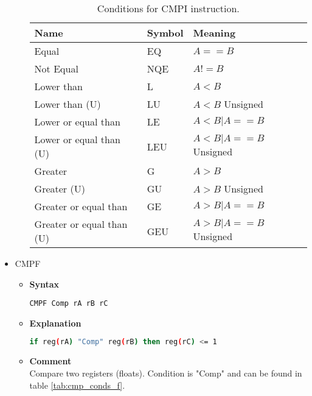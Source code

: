 \begin{itemize}
\begin{itemize}
    \begin{table}[h]
        \centering
        \begin{tabular}{|l|l|l|}
            \hline
            \textbf{Name}             & \textbf{Symbol} & \textbf{Meaning}      \\ \hline
            Equal                     & EQ              & $A==B$                \\ \hline
            Not Equal                 & NQE             & $A!=B$                \\ \hline
            Lower than                & L               & $A<B$                 \\ \hline
            Lower than (U)            & LU              & $A<B$ Unsigned        \\ \hline
            Lower or equal than       & LE              & $A<B | A==B$          \\ \hline
            Lower or equal than (U)   & LEU             & $A<B | A==B$ Unsigned \\ \hline
            Greater                   & G               & $A>B$                 \\ \hline
            Greater (U)               & GU              & $A>B$ Unsigned        \\ \hline
            Greater or equal than     & GE              & $A>B | A==B$          \\ \hline
            Greater or equal than (U) & GEU             & $A>B | A==B$ Unsigned \\ \hline
        \end{tabular}
        \caption{Conditions for CMPI instruction.}
        \label{tab:cmp_conds_i}
    \end{table}

    \end{itemize}

    \item CMPF
    \begin{itemize}
        \item \textbf{Syntax}
        \begin{lstlisting}[language={[markII]Assembler}, frame=single]
    CMPF Comp rA rB rC
        \end{lstlisting}
        \item \textbf{Explanation}
        \begin{lstlisting}[language=bash, frame=single]
    if reg(rA) "Comp" reg(rB) then reg(rC) <= 1
        \end{lstlisting}
        \item \textbf{Comment} \\
    Compare two registers (floats). Condition is "Comp" and can be found in table \ref{tab:cmp_conds_f}.


\end{itemize}
\end{itemize}

